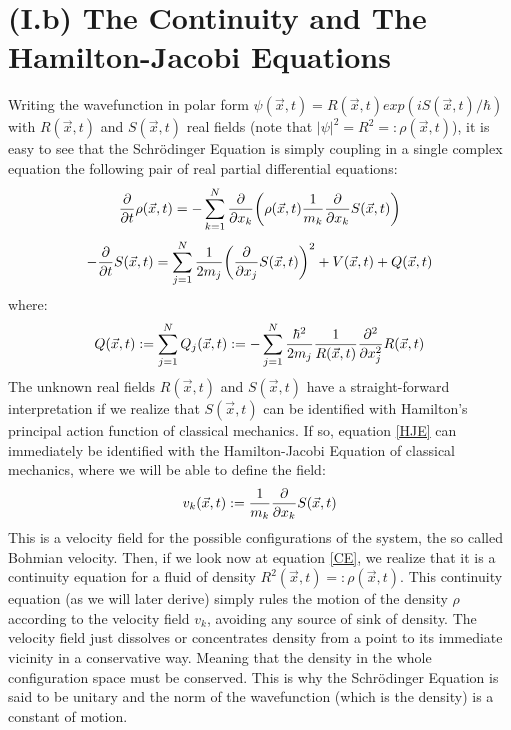 \documentclass[11pt, a4paper]{article} %
\begin{document}
\section*{(I.b) The Continuity and The Hamilton-Jacobi Equations}
Writing the wavefunction in polar form $\psi(\vec{x},t)=R(\vec{x},t)exp(iS(\vec{x},t)/\hbar)$ with $R(\vec{x},t)$ and $S(\vec{x},t)$ real fields (note that $|\psi|^2=R^2=:\rho(\vec{x},t)$), it is easy to see that the Schrödinger Equation is simply coupling in a single complex equation the following pair of real partial differential equations:
\begin{equation}\label{CE}
\pdv{}{t} \rho(\vec{x},t)=-\sum_{k=1}^N \pdv{}{x_k}\qty( \rho(\vec{x},t)\frac{1}{m_k}\pdv{}{x_k} S(\vec{x},t) )
\end{equation}
\begin{equation}\label{HJE}
-\pdv{}{t}S(\vec{x},t) = \sum_{j=1}^N \frac{1}{2m_j} \qty(\pdv{}{x_j} S(\vec{x},t) )^2+ V(\vec{x},t)+Q(\vec{x},t)
\end{equation}
where:
\begin{equation}\label{QP}
Q(\vec{x},t):=\sum_{j=1}^N Q_j(\vec{x},t):=-\sum_{j=1}^N \frac{\hbar^2}{2m_j}\frac{1}{R(\vec{x},t)}\pdv[2]{}{x_j} R(\vec{x},t)
\end{equation}
The unknown real fields $R(\vec{x},t)$ and $S(\vec{x},t)$ have a straight-forward interpretation if we realize that $S(\vec{x},t)$ can be identified with Hamilton's principal action function of classical mechanics. If so, equation \eqref{HJE} can immediately be identified with the Hamilton-Jacobi Equation of classical mechanics, where we will be able to define the field:%
\begin{equation}
v_k(\vec{x},t):=\frac{1}{m_k}\pdv{}{x_k}S(\vec{x},t)
\end{equation}
This is a velocity field for the possible configurations of the system, the so called Bohmian velocity. Then, if we look now at equation \eqref{CE}, we realize that it is a continuity equation for a fluid of density $R^2(\vec{x},t)=:\rho(\vec{x},t)$. This continuity equation (as we will later derive) simply rules the motion of the density $\rho$ according to the velocity field $v_k$, avoiding any source of sink of density. The velocity field just dissolves or concentrates density from a point to its immediate vicinity in a conservative way. Meaning that the density in the whole configuration space must be conserved. This is why the Schrödinger Equation is said to be unitary and the norm of the wavefunction (which is the density) is a constant of motion.
\end{document}
